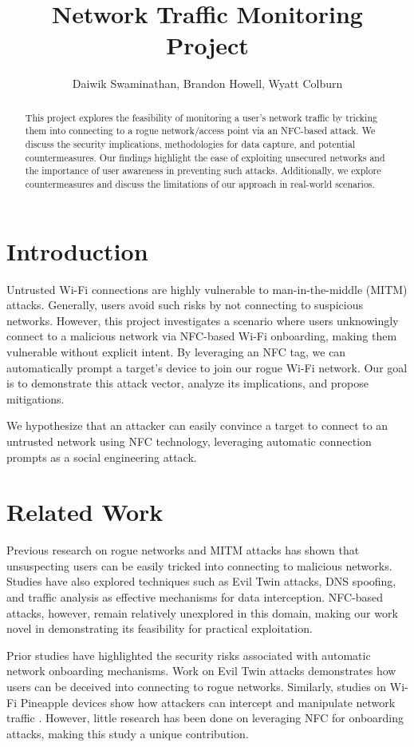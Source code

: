 \documentclass[sigconf]{acmart}
\title{Network Traffic Monitoring Project}
\author{Daiwik Swaminathan, Brandon Howell, Wyatt Colburn}
\affiliation{\institution{California Polytechnic State University, San Luis Obispo}}
\begin{document}
\begin{abstract}
This project explores the feasibility of monitoring a user's network traffic by tricking them into connecting to a rogue network/access point via an NFC-based attack. We discuss the security implications, methodologies for data capture, and potential countermeasures. Our findings highlight the ease of exploiting unsecured networks and the importance of user awareness in preventing such attacks. Additionally, we explore countermeasures and discuss the limitations of our approach in real-world scenarios.
\end{abstract}

\maketitle

\section{Introduction}
Untrusted Wi-Fi connections are highly vulnerable to man-in-the-middle (MITM) attacks. Generally, users avoid such risks by not connecting to suspicious networks. However, this project investigates a scenario where users unknowingly connect to a malicious network via NFC-based Wi-Fi onboarding, making them vulnerable without explicit intent. By leveraging an NFC tag, we can automatically prompt a target's device to join our rogue Wi-Fi network. Our goal is to demonstrate this attack vector, analyze its implications, and propose mitigations.

We hypothesize that an attacker can easily convince a target to connect to an untrusted network using NFC technology, leveraging automatic connection prompts as a social engineering attack.

\section{Related Work}
Previous research on rogue networks and MITM attacks \cite{mitm} has shown that unsuspecting users can be easily tricked into connecting to malicious networks. Studies have also explored techniques such as Evil Twin attacks, DNS spoofing, and traffic analysis as effective mechanisms for data interception. NFC-based attacks, however, remain relatively unexplored in this domain, making our work novel in demonstrating its feasibility for practical exploitation.

Prior studies have highlighted the security risks associated with automatic network onboarding mechanisms. Work on Evil Twin attacks \cite{eviltwin} demonstrates how users can be deceived into connecting to rogue networks. Similarly, studies on Wi-Fi Pineapple devices show how attackers can intercept and manipulate network traffic \cite{wifipineapple}. However, little research has been done on leveraging NFC for onboarding attacks, making this study a unique contribution.
\end{document}

